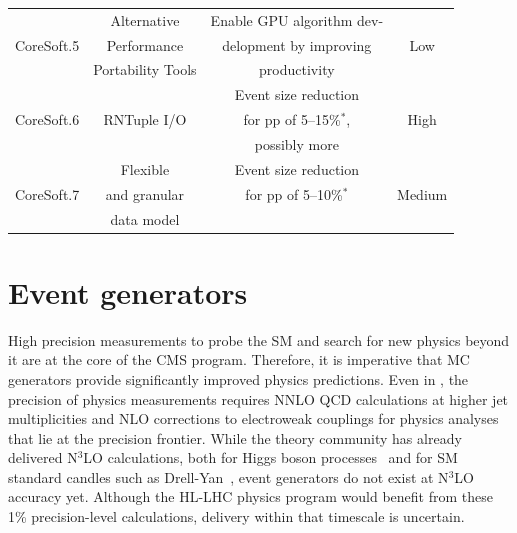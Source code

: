 \begin{table}[tbph]
\begin{tabular}{|c|c|c|c|}
    \cellcolor{tablerowheader}
           & Alternative              & Enable GPU algorithm dev- &          \\
    \cellcolor{tablerowheader}
CoreSoft.5 & Performance              & delopment by improving     &   Low    \\
    \cellcolor{tablerowheader}
           & Portability Tools        & productivity              &          \\ \hline
    \cellcolor{tablerowheader}
           &                          & Event size reduction      &          \\
    \cellcolor{tablerowheader}
CoreSoft.6 & RNTuple I/O              & for pp of 5--15\%$^*$,       &   High    \\
    \cellcolor{tablerowheader}
           &                          & possibly more             &          \\ \hline
    \cellcolor{tablerowheader}
           & Flexible                 & Event size reduction      &          \\
    \cellcolor{tablerowheader}
CoreSoft.7 & and granular             & for pp of 5--10\%$^*$       &   Medium    \\
    \cellcolor{tablerowheader}
           &  data model              &                           &          \\ \hline
    \end{tabular}
\end{table}

\clearpage

%
%
% 
\section{Event generators}
\label{sec:Generators}

High precision measurements to probe the \gls{SM} and search for new physics beyond it are at the core of the \PhaseTwo CMS program. Therefore, it is imperative that \gls{MC} generators provide significantly improved physics predictions. Even in \PhaseOne, the precision of physics measurements requires \gls{NNLO} QCD calculations at higher jet multiplicities and \gls{NLO} corrections to electroweak couplings for physics analyses that lie at the precision frontier. While the theory community has already delivered N$^3$\gls{LO} calculations, both for Higgs boson processes~\cite{Mistlberger:2018etf} and for \gls{SM} standard candles such as Drell-Yan~\cite{Duhr:2020sdp}, event generators do not exist at N$^3$\gls{LO} accuracy yet. Although the \gls{HL-LHC} physics program would benefit from these 1\% precision-level calculations, delivery within that timescale is uncertain.

